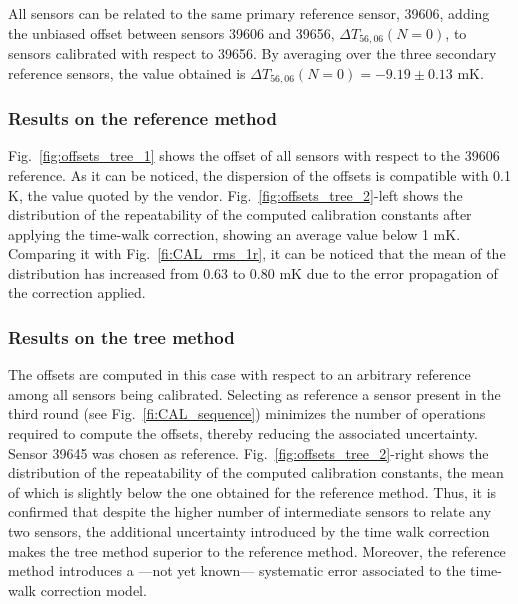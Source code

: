 All sensors can be related to the same primary reference sensor, 39606, adding  the unbiased offset between sensors 39606 and 39656,  $\Delta T_{56,06}(N=0)$, to sensors calibrated with respect to 39656. By averaging over the three secondary reference sensors, the value obtained is $\Delta T_{56,06}(N=0)=-9.19\pm0.13$ mK.

\subsubsection{Results on the reference method}
\label{sec:results_reference}
\noindent Fig.~\ref{fig:offsets_tree_1} shows the offset of all sensors with respect to the 39606 reference. As it can be noticed, the dispersion of the offsets is compatible with 0.1 K, the value quoted by the vendor. Fig.~\ref{fig:offsets_tree_2}-left shows the distribution of the repeatability of the computed calibration constants after applying the time-walk correction, showing an average value below 1 mK. Comparing it with Fig.~\ref{fi:CAL_rms_1r}, it can be noticed that the mean of the distribution has increased from 0.63 to 0.80 mK due to the error propagation of the correction applied.

\subsubsection{Results on the tree method}
\noindent The offsets are computed in this case with respect to an arbitrary reference among all sensors being calibrated. Selecting as reference a sensor present in the third round (see Fig.~\ref{fi:CAL_sequence}) minimizes the number of operations required to compute the offsets, thereby reducing the associated uncertainty. Sensor 39645 was chosen as reference. Fig.~\ref{fig:offsets_tree_2}-right shows the distribution of the repeatability of the computed calibration constants, the mean of which is slightly below the one obtained for the reference method. Thus, it is confirmed that despite the higher number of intermediate sensors to relate any two sensors, the additional uncertainty introduced by the time walk correction makes the tree method superior to the reference method. Moreover, the reference method introduces a ---not yet known--- systematic error associated to the time-walk correction model.

